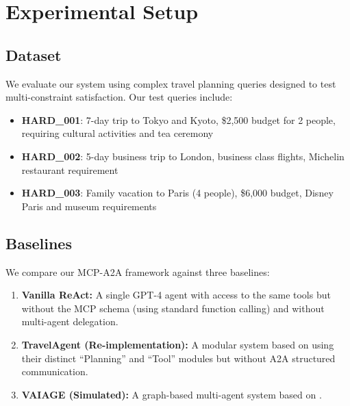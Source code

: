 \documentclass[10pt,twocolumn]{article}
\begin{document}
\section{Experimental Setup}

\subsection{Dataset}
We evaluate our system using complex travel planning queries designed to test multi-constraint satisfaction. Our test queries include:

\begin{itemize}
    \item \textbf{HARD\_001}: 7-day trip to Tokyo and Kyoto, \$2,500 budget for 2 people, requiring cultural activities and tea ceremony
    \item \textbf{HARD\_002}: 5-day business trip to London, business class flights, Michelin restaurant requirement
    \item \textbf{HARD\_003}: Family vacation to Paris (4 people), \$6,000 budget, Disney Paris and museum requirements
\end{itemize}

\subsection{Baselines}
We compare our MCP-A2A framework against three baselines:
\begin{enumerate}
    \item \textbf{Vanilla ReAct:} A single GPT-4 agent with access to the same tools but without the MCP schema (using standard function calling) and without multi-agent delegation.
    \item \textbf{TravelAgent (Re-implementation):} A modular system based on \cite{chen2024travelagent} using their distinct ``Planning'' and ``Tool'' modules but without A2A structured communication.
    \item \textbf{VAIAGE (Simulated):} A graph-based multi-agent system based on \cite{ge2025vaiage}.
\end{enumerate}
\end{document}
